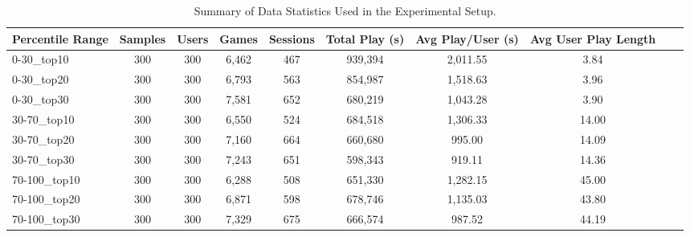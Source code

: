 \begin{table*}[ht]
\setlength{\tabcolsep}{4pt} %
\renewcommand{\arraystretch}{0.9} %
\small %
\centering
\begin{tabular}{|l|c|c|c|c|c|c|c|c|c|}
\hline
\textbf{Percentile Range} & \textbf{Samples} & \textbf{Users} & \textbf{Games}  & \textbf{Sessions} & \textbf{Total Play (s)} & \textbf{Avg Play/User (s)} & \textbf{Avg User Play Length} \\
\hline
0-30\_top10 & 300 & 300 & 6,462 & 467 & 939,394 & 2,011.55 & 3.84 \\
0-30\_top20 & 300 & 300 & 6,793 & 563 & 854,987 & 1,518.63 & 3.96 \\
0-30\_top30 & 300 & 300 & 7,581 & 652 & 680,219 & 1,043.28 & 3.90 \\ \hline
30-70\_top10 & 300 & 300 & 6,550 & 524 & 684,518 & 1,306.33 & 14.00 \\
30-70\_top20 & 300 & 300 & 7,160 & 664 & 660,680 & 995.00 & 14.09 \\
30-70\_top30 & 300 & 300 & 7,243 & 651 & 598,343 & 919.11 & 14.36 \\ \hline
70-100\_top10 & 300 & 300 & 6,288 & 508 & 651,330 & 1,282.15 & 45.00 \\
70-100\_top20 & 300 & 300 & 6,871 & 598 & 678,746 & 1,135.03 & 43.80 \\
70-100\_top30 & 300 & 300 & 7,329 & 675 & 666,574 & 987.52 & 44.19 \\
\hline
\end{tabular}
\caption{Summary of Data Statistics Used in the Experimental Setup.}
\label{tab:data_statistics}
\vskip -0.2in
\end{table*}